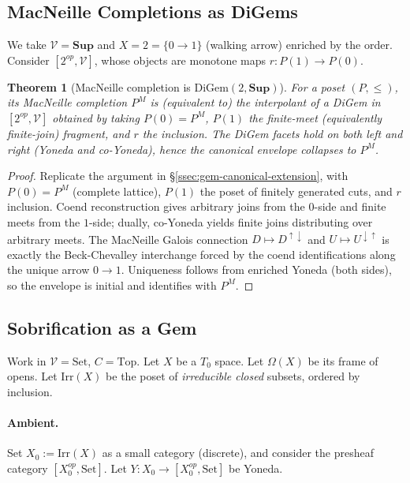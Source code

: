 \documentclass[11pt]{article}
\theoremstyle{plain}
\newtheorem{theorem}{Theorem}[section]
\theoremstyle{definition}
\theoremstyle{remark}
\newcommand{\V}{\mathcal{V}}
\newcommand{\Top}{\mathrm{Top}}
\newcommand{\Set}{\mathrm{Set}}
\begin{document}
\subsection{MacNeille Completions as DiGems}\label{ssec:digem-macneille}

We take $\V=\mathbf{Sup}$ and $X=2=\{0\to 1\}$ (walking arrow) enriched by the order. Consider $[2^{op},\V]$, whose objects are monotone maps $r:P(1)\to P(0)$.

\begin{theorem}[MacNeille completion is DiGem$(2,\mathbf{Sup})$]
For a poset $(P,\le)$, its MacNeille completion $P^M$ is (equivalent to) the interpolant of a DiGem in $[2^{op},\V]$ obtained by taking $P(0)=P^M$, $P(1)$ the finite-meet (equivalently finite-join) fragment, and $r$ the inclusion. The DiGem facets hold on both left and right (Yoneda and co-Yoneda), hence the canonical envelope collapses to $P^M$.
\end{theorem}

\begin{proof}
Replicate the argument in \S\ref{ssec:gem-canonical-extension}, with $P(0)=P^M$ (complete lattice), $P(1)$ the poset of finitely generated cuts, and $r$ inclusion. Coend reconstruction gives arbitrary joins from the $0$-side and finite meets from the $1$-side; dually, co-Yoneda yields finite joins distributing over arbitrary meets. The MacNeille Galois connection $D\mapsto D^{\uparrow\downarrow}$ and $U\mapsto U^{\downarrow\uparrow}$ is exactly the Beck-Chevalley interchange forced by the coend identifications along the unique arrow $0\to 1$. Uniqueness follows from enriched Yoneda (both sides), so the envelope is initial and identifies with $P^M$.
\end{proof}

\subsection{Sobrification as a Gem}\label{ssec:gem-sobrification}

Work in $\V=\Set$, $C=\Top$. Let $X$ be a $T_0$ space. Let $\Omega(X)$ be its frame of opens. Let $\mathrm{Irr}(X)$ be the poset of \emph{irreducible closed} subsets, ordered by inclusion.

\paragraph{Ambient.}
Set $X_0:=\mathrm{Irr}(X)$ as a small category (discrete), and consider the presheaf category $[X_0^{op},\Set]$. Let $Y:X_0\to [X_0^{op},\Set]$ be Yoneda.
\end{document}
